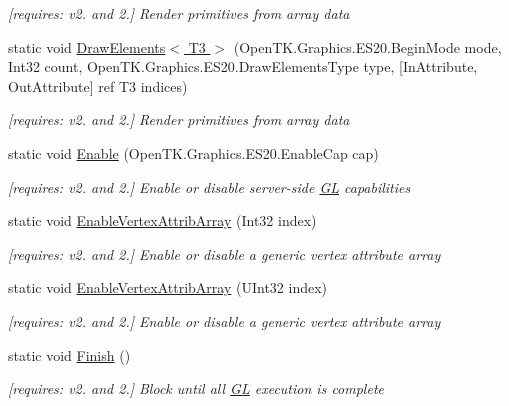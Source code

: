 \begin{DoxyCompactItemize}
\begin{DoxyCompactList}\small\item\em \mbox{[}requires\-: v2. and 2.\mbox{]} Render primitives from array data \end{DoxyCompactList}\item 
static void \hyperlink{class_open_t_k_1_1_graphics_1_1_e_s20_1_1_g_l_a0aebe890dc7cc288e6d75d2b6fa6b0ca}{Draw\-Elements$<$ T3 $>$} (Open\-T\-K.\-Graphics.\-E\-S20.\-Begin\-Mode mode, Int32 count, Open\-T\-K.\-Graphics.\-E\-S20.\-Draw\-Elements\-Type type, \mbox{[}In\-Attribute, Out\-Attribute\mbox{]} ref T3 indices)
\begin{DoxyCompactList}\small\item\em \mbox{[}requires\-: v2. and 2.\mbox{]} Render primitives from array data \end{DoxyCompactList}\item 
static void \hyperlink{class_open_t_k_1_1_graphics_1_1_e_s20_1_1_g_l_afdd7401cd44b6bdc0969f01cc820db2d}{Enable} (Open\-T\-K.\-Graphics.\-E\-S20.\-Enable\-Cap cap)
\begin{DoxyCompactList}\small\item\em \mbox{[}requires\-: v2. and 2.\mbox{]} Enable or disable server-\/side \hyperlink{class_open_t_k_1_1_graphics_1_1_e_s20_1_1_g_l}{G\-L} capabilities \end{DoxyCompactList}\item 
static void \hyperlink{class_open_t_k_1_1_graphics_1_1_e_s20_1_1_g_l_a2f17cbf14d1b6ecede1e80f3ac2aba53}{Enable\-Vertex\-Attrib\-Array} (Int32 index)
\begin{DoxyCompactList}\small\item\em \mbox{[}requires\-: v2. and 2.\mbox{]} Enable or disable a generic vertex attribute array \end{DoxyCompactList}\item 
static void \hyperlink{class_open_t_k_1_1_graphics_1_1_e_s20_1_1_g_l_a083319ac0d81de626c0c8d06c76610f1}{Enable\-Vertex\-Attrib\-Array} (U\-Int32 index)
\begin{DoxyCompactList}\small\item\em \mbox{[}requires\-: v2. and 2.\mbox{]} Enable or disable a generic vertex attribute array \end{DoxyCompactList}\item 
static void \hyperlink{class_open_t_k_1_1_graphics_1_1_e_s20_1_1_g_l_ad794990a5a8863630072233558aea224}{Finish} ()
\begin{DoxyCompactList}\small\item\em \mbox{[}requires\-: v2. and 2.\mbox{]} Block until all \hyperlink{class_open_t_k_1_1_graphics_1_1_e_s20_1_1_g_l}{G\-L} execution is complete \end{DoxyCompactList}\item 

\end{DoxyCompactItemize}
